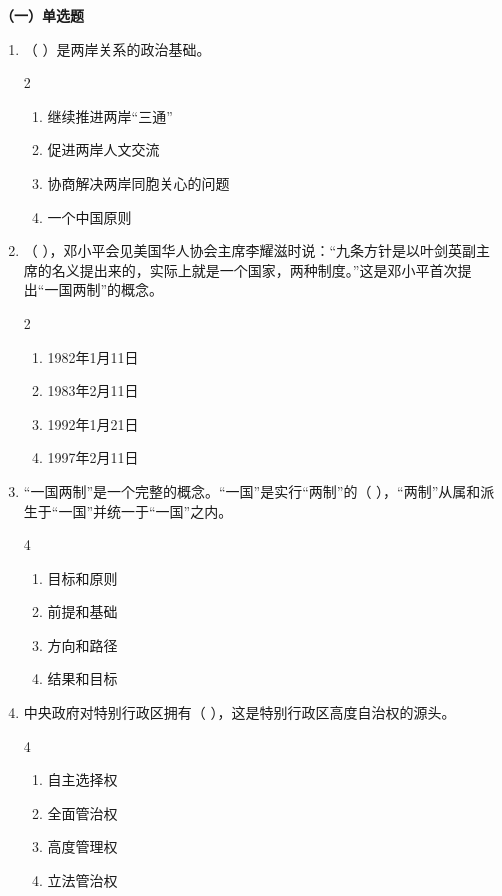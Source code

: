 \documentclass[a4paper,11pt]{ctexart}
\begin{document}
\textbf{（一）单选题}
\begin{enumerate}
    \item （ ）是两岸关系的政治基础。
    \begin{multicols}{2}
    \begin{enumerate}
        \item 继续推进两岸“三通”
        \item 促进两岸人文交流
        \item 协商解决两岸同胞关心的问题
        \item 一个中国原则
    \end{enumerate}
    \end{multicols}

    \item （ ），邓小平会见美国华人协会主席李耀滋时说：“九条方针是以叶剑英副主席的名义提出来的，实际上就是一个国家，两种制度。”这是邓小平首次提出“一国两制”的概念。
    \begin{multicols}{2}
    \begin{enumerate}
        \item 1982年1月11日
        \item 1983年2月11日
        \item 1992年1月21日
        \item 1997年2月11日
    \end{enumerate}
    \end{multicols}

    \item “一国两制”是一个完整的概念。“一国”是实行“两制”的（ ），“两制”从属和派生于“一国”并统一于“一国”之内。
    \begin{multicols}{4}
    \begin{enumerate}
        \item 目标和原则
        \item 前提和基础
        \item 方向和路径
        \item 结果和目标
    \end{enumerate}
    \end{multicols}

    \item 中央政府对特别行政区拥有（ ），这是特别行政区高度自治权的源头。
    \begin{multicols}{4}
    \begin{enumerate}
        \item 自主选择权
        \item 全面管治权
        \item 高度管理权
        \item 立法管治权
    \end{enumerate}
    \end{multicols}


\end{enumerate}
\end{document}
